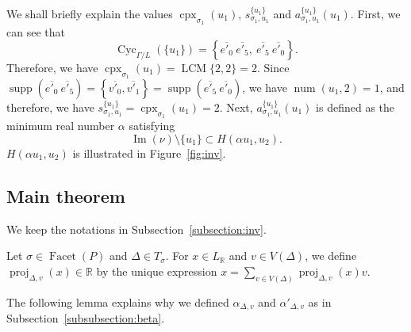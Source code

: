 \begin{ex}
We shall briefly explain the values 
$\operatorname{cpx}_{\sigma _1}(u_1)$, 
$s_{\sigma _1, u_1}^{\{ u_1 \}}$ and $a_{\sigma _1, u_1}^{\{ u_1 \}} (u_1)$. 
First, we can see that 
\[
\operatorname{Cyc}_{\Gamma /L}(\{ u_1 \})
= \left \{ \overline{e'_0}\ \overline{e'_5}, \ \overline{e'_5}\ \overline{e'_0} \right \}. 
\]
Therefore, we have $\operatorname{cpx}_{\sigma _1}(u_1) = \operatorname{LCM}\{ 2,2 \} = 2$. 
Since $\operatorname{supp}\left( \overline{e'_0}\ \overline{e'_5} \right) = 
\left \{ \overline{v'_0}, \overline{v'_1} \right \} =
\operatorname{supp}\left( \overline{e'_5}\ \overline{e'_0} \right)$, 
we have $\operatorname{num}(u_1, 2) = 1$, and therefore, 
we have $s_{\sigma _1, u_1}^{\{ u_1 \}} = \operatorname{cpx}_{\sigma _1}(u_1)  = 2$. 
Next, $a_{\sigma _1, u_1}^{\{ u_1 \}} (u_1)$ is defined as the minimum real number $\alpha$ satisfying
\[
\operatorname{Im}(\nu) \setminus \{ u_1 \} \subset H(\alpha u_1, u_2). 
\]
$H \left( \alpha u_1, u_2 \right)$ is illustrated in Figure~\ref{fig:inv}. 
\end{ex}


\subsection{Main theorem}\label{subsection:main}
We keep the notations in Subsection~\ref{subsection:inv}. 

\begin{defn}
Let $\sigma \in \operatorname{Facet}(P)$ and $\Delta \in T_{\sigma}$. 
For $x \in L_{\mathbb{R}}$ and $v \in V(\Delta)$, we define $\operatorname{proj}_{\Delta, v}(x) \in \mathbb{R}$ by the unique expression
$x = \sum _{v \in V(\Delta)} \operatorname{proj}_{\Delta, v}(x) v$. 
\end{defn}

The following lemma explains why we defined $\alpha _{\Delta, v}$ and $\alpha' _{\Delta, v}$ as in Subsection~\ref{subsubsection:beta}. 

